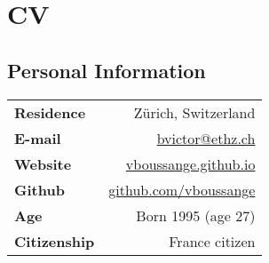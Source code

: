 %
\chapter{CV}
\label{sec:CV}

\section*{Personal Information}
  \begin{tabular}{l r}
    \textbf{\color{ctcolortitle}Residence} & Zürich, Switzerland\\
    \textbf{\color{ctcolortitle}E-mail}  & \hyperlink{emailto:bvictor@ethz.ch}{{\color{ctcoloraccessory}bvictor@ethz.ch}}\\
    \textbf{\color{ctcolortitle}Website} & \hyperlink{https://vboussange.github.io}{{\color{ctcoloraccessory}vboussange.github.io}}\\
    \textbf{\color{ctcolortitle}Github}  & \hyperlink{https://www.github.com/vboussange}{{\color{ctcoloraccessory}github.com/vboussange}}\\
    \textbf{\color{ctcolortitle}Age}  & Born 1995 (age 27)\\
    \textbf{\color{ctcolortitle}Citizenship}  & France citizen\\
    \end{tabular}

